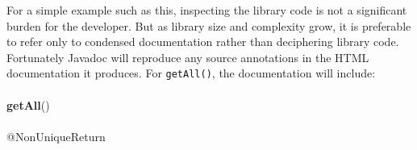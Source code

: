 For a simple example such as this, inspecting the library code is not a
significant burden for the developer.  But as library size and complexity grow,
it is preferable to refer only to condensed documentation rather than
deciphering library code.
Fortunately Javadoc will reproduce any source annotations in the HTML
documentation it produces.  For \texttt{getAll()}, the documentation will
include:\\
\\
{\bf getAll}()\\
\\
@NonUniqueReturn\\
